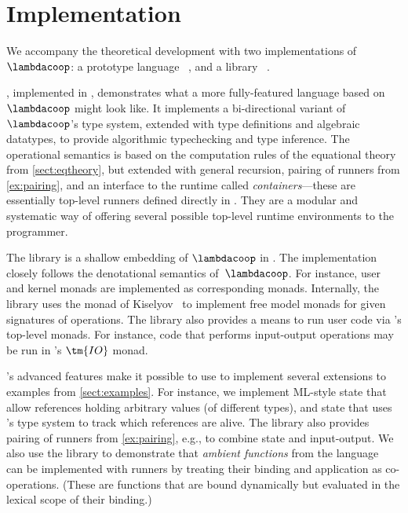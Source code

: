 
\section{Implementation}
\label{sect:implementation}

We accompany the theoretical development with two implementations of~$\lambdacoop$: a
prototype language ~\cite{bauer19:Coop}, and a  library
~\cite{ahman19:HaskellCoop}.

, implemented in , demonstrates what a more fully-featured
language based on $\lambdacoop$ might look like.
%
It implements a bi-directional variant of $\lambdacoop$'s type system, extended
with type definitions and algebraic datatypes, to provide algorithmic typechecking and
type inference. The operational semantics is based on the computation rules of the
equational theory from \cref{sect:eqtheory}, but extended with general
recursion, pairing of runners from \cref{ex:pairing}, and an interface to the 
 runtime called \emph{containers}---these are essentially top-level runners
defined directly in . They are a modular and systematic way of
offering several possible top-level runtime environments to the programmer.

The  library is a shallow embedding of $\lambdacoop$ in 
. The implementation closely follows the denotational
semantics of~$\lambdacoop$. For instance, user and kernel monads are
implemented as corresponding  monads. Internally, the library
uses the  monad of Kiselyov~\cite{Kiselyov:Freer}
to implement free model monads for given signatures of operations.
The library also provides a means to run user code via 's top-level monads.
For instance, code that performs input-output operations may be run in 's $\tm{IO}$ monad.

's advanced features
make it possible to use  to implement several 
extensions to examples from \cref{sect:examples}.
For instance, we implement ML-style state that allow references
holding arbitrary values (of different types), and state 
that uses 's type system to track
which references are alive.
%
The library also provides pairing of runners from \cref{ex:pairing}, e.g., 
to combine state and input-output.
%
We also use the library to demonstrate that
\emph{ambient functions} from the  language~\cite{Leijen:Ambients}
can be implemented with runners by treating their binding
and application as co-operations.
(These are functions that are bound dynamically but evaluated
in the lexical scope of their binding.)


